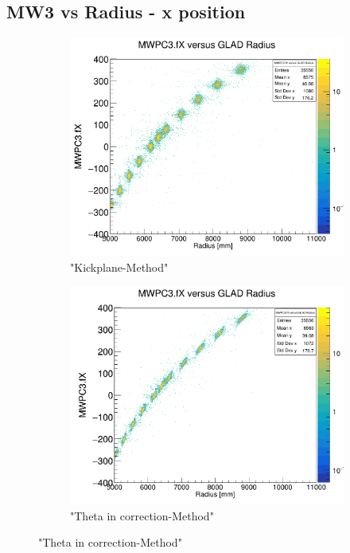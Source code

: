 \documentclass[12pt, letterpaper]{article}
\begin{document}
\subsection{MW3 vs Radius - x position}
\begin{figure}[!htbp]
\begin{subfigure}{.5\textwidth}
  \centering
  \includegraphics[width=.9\linewidth]{plot_imgs/mw3_rho_get_centr.png}  
  \caption{"Kickplane-Method"}
  \label{fig:sub-first}
\end{subfigure}
\begin{subfigure}{.5\textwidth}
  \centering
  \includegraphics[width=.9\linewidth]{plot_imgs/mw3_rho_corr.png} 
  \caption{"Theta \textunderscore in correction-Method"}
  \label{fig:sub-second}

\end{subfigure}
\end{figure}
\end{document}

